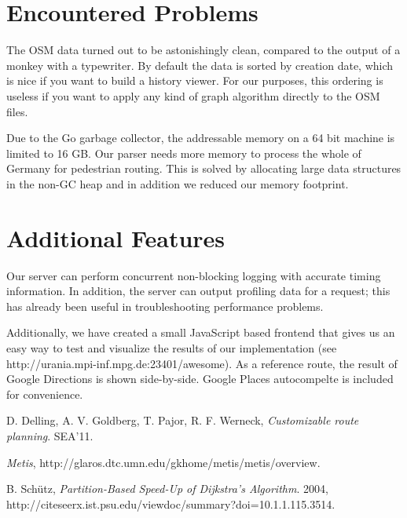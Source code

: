 \documentclass[a4paper]{article}
\begin{document}
\section{Encountered Problems}

The OSM data turned out to be astonishingly clean, compared to the output of a monkey with a typewriter.
By default the data is sorted by creation date, which is nice if you want to build a history viewer.
For our purposes, this ordering is useless if you want to apply any kind of graph algorithm
directly to the OSM files.

Due to the Go garbage collector, the addressable memory on a 64 bit machine is limited to 16 GB.
Our parser needs more memory to process the whole of Germany for pedestrian routing.
This is solved by allocating large data structures in the non-GC heap
and in addition we reduced our memory footprint.

\section{Additional Features}

Our server can perform concurrent non-blocking logging with accurate timing information.
In addition, the server can output profiling data for a request;
this has already been useful in troubleshooting performance problems.

Additionally, we have created a small JavaScript based frontend that 
gives us an easy way to test and visualize the results of our implementation
(see http://urania.mpi-inf.mpg.de:23401/awesome).
As a reference route, the result of Google Directions is shown side-by-side.
Google Places autocompelte is included for convenience.

\begin{thebibliography}{9}
  
	D. Delling, A. V. Goldberg, T. Pajor, R. F. Werneck, \emph{Customizable route planning}. SEA'11. 
	
    \emph{Metis}, http://glaros.dtc.umn.edu/gkhome/metis/metis/overview.

	B. Schütz, \emph{Partition-Based Speed-Up of Dijkstra's Algorithm}. 2004, http://citeseerx.ist.psu.edu/viewdoc/summary?doi=10.1.1.115.3514.

\end{thebibliography}
\end{document}
